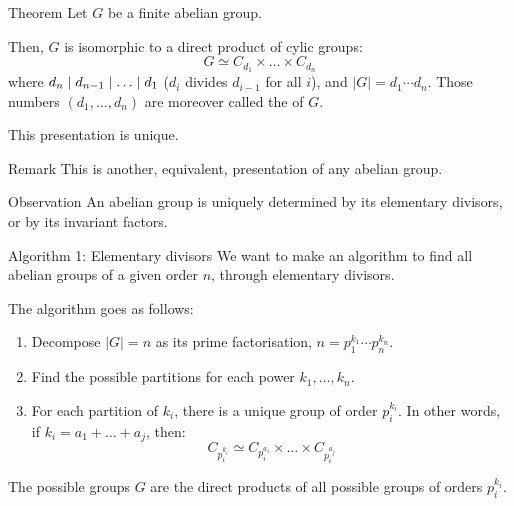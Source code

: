 \documentclass[a4paper]{article}
\begin{document}
\begin{parag}{Theorem}
    Let $G$ be a finite abelian group. 

    Then, $G$ is isomorphic to a direct product of cylic groups:
    \[G \simeq C_{d_1} \times \ldots \times C_{d_n}\]
    where $d_n \mid d_{n-1} \mid \ldots \mid d_1$ ($d_i$ divides $d_{i-1}$ for all $i$), and $\left|G\right| = d_1 \cdots d_n$. Those numbers $\left(d_1, \ldots, d_n\right)$ are moreover called the  of $G$.

    This presentation is unique.

    \begin{subparag}{Remark}
        This is another, equivalent, presentation of any abelian group.
    \end{subparag}
\end{parag}

\begin{parag}{Observation}
    An abelian group is uniquely determined by its elementary divisors, or by its invariant factors.
\end{parag}

\begin{parag}{Algorithm 1: Elementary divisors}
        We want to make an algorithm to find all abelian groups of a given order $n$, through elementary divisors.

        The algorithm goes as follows:
        \begin{enumerate}
            \item Decompose $\left|G\right| = n$ as its prime factorisation, $n = p_1^{k_1} \cdots p_n^{k_n}$.
            \item Find the possible partitions for each power $k_1, \ldots, k_n$.
            \item For each partition of $k_i$, there is a unique group of order $p_i^{k_i}$. In other words, if $k_i = a_1 + \ldots + a_j$, then: 
            \[C_{p_i^{k_i}} \simeq C_{p_i^{a_1}} \times \ldots \times C_{p_i ^{a_j}}\]
        \end{enumerate}
        
        The possible groups $G$ are the direct products of all possible groups of orders $p_i^{k_i}$.
\end{parag}
\end{document}
